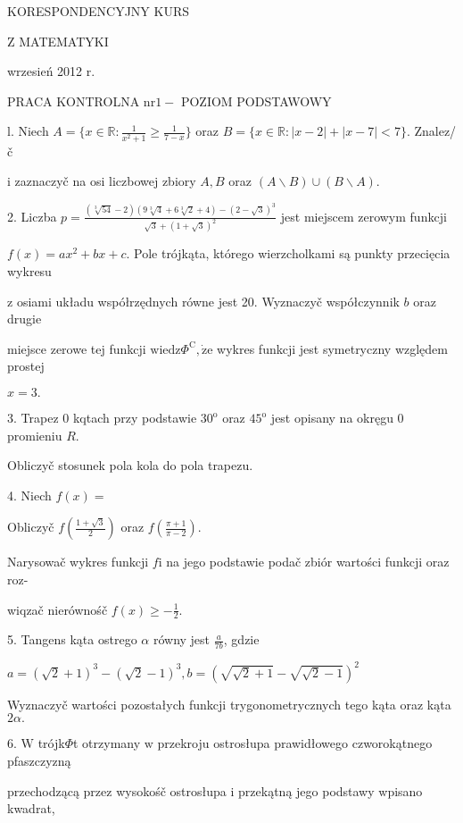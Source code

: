 \documentclass[a4paper,12pt]{article}
\begin{document}
KORESPONDENCYJNY KURS

Z MATEMATYKI

wrzesień 2012 r.

PRACA KONTROLNA $\mathrm{n}\mathrm{r} 1 -$ POZIOM PODSTAWOWY

l. Niech $A=\displaystyle \{x\in \mathbb{R}:\frac{1}{x^{2}+1}\geq\frac{1}{7-x}\}$ oraz $B=\{x\in \mathbb{R}:|x-2|+|x-7|<7\}$. Znalez/č

$\mathrm{i}$ zaznaczyč na osi liczbowej zbiory $A, B$ oraz $(A\backslash B)\cup(B\backslash A).$

2. Liczba $p=\displaystyle \frac{(\sqrt[3]{54}-2)(9\sqrt[3]{4}+6\sqrt[3]{2}+4)-(2-\sqrt{3})^{3}}{\sqrt{3}+(1+\sqrt{3})^{2}}$ jest miejscem zerowym funkcji

$f(x)=ax^{2}+bx+c$. Pole trójkąta, którego wierzcholkami są punkty przecięcia wykresu

$\mathrm{z}$ osiami układu współrzędnych równe jest 20. Wyznaczyč współczynnik $b$ oraz drugie

miejsce zerowe tej funkcji $\mathrm{w}\mathrm{i}\mathrm{e}\mathrm{d}\mathrm{z}\Phi^{\mathrm{C}}, \dot{\mathrm{z}}\mathrm{e}$ wykres funkcji jest symetryczny względem prostej

$x=3.$

3. Trapez $0$ kqtach przy podstawie $30^{\mathrm{o}}$ oraz $45^{\mathrm{o}}$ jest opisany na okręgu $0$ promieniu $R.$

Obliczyč stosunek pola kola do pola trapezu.

4. Niech $f(x)=$

Obliczyč $f(\displaystyle \frac{1+\sqrt{3}}{2})$ oraz $f(\displaystyle \frac{\pi+1}{\pi-2}).$

Narysowač wykres funkcji $f\mathrm{i}$ na jego podstawie podač zbiór wartości funkcji oraz roz-

wiqzač nierównośč $f(x)\displaystyle \geq-\frac{1}{2}.$

5. Tangens kąta ostrego $\alpha$ równy jest $\displaystyle \frac{a}{7b}$, gdzie

$a=(\sqrt{2}+1)^{3}-(\sqrt{2}-1)^{3},b=(\sqrt{\sqrt{2}+1}-\sqrt{\sqrt{2}-1})^{2}$

Wyznaczyč wartości pozostałych funkcji trygonometrycznych tego kąta oraz kąta $2\alpha.$

6. $\mathrm{W}$ trójk$\Phi$t otrzymany $\mathrm{w}$ przekroju ostrosłupa prawidłowego czworokątnego pfaszczyzną

przechodzącą przez wysokośč ostrosłupa $\mathrm{i}$ przekątną jego podstawy wpisano kwadrat,
\end{document}
